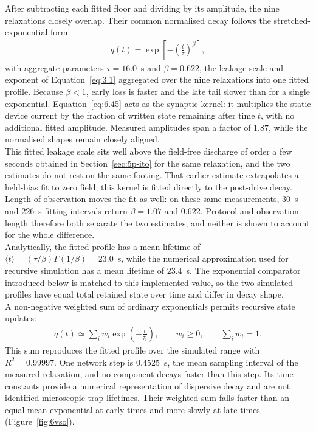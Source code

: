 \noindent After subtracting each fitted floor and dividing by its amplitude, the nine relaxations closely overlap.
Their common normalised decay follows the stretched-exponential form
\begin{align}
    q(t) = \exp\!\left[ -\left( \frac{t}{\tau} \right)^{\!\beta} \right], \label{eq:6.45}
\end{align}
\noindent with aggregate parameters $\tau=16.0$~s and $\beta=0.622$, the leakage scale and exponent of
Equation~\ref{eq:3.1} aggregated over the nine relaxations into one fitted profile. Because $\beta<1$, early loss is
faster and the late tail slower than for a single exponential. Equation~\ref{eq:6.45} acts as the synaptic kernel:
it multiplies the static device current by the fraction of written state remaining after time $t$, with no
additional fitted amplitude. Measured amplitudes span a factor of $1.87$, while the normalised shapes remain
closely aligned.\\

\noindent This fitted leakage scale sits well above the field-free discharge of order a few seconds obtained in
Section~\ref{sec:5p-ito} for the same relaxation, and the two estimates do not rest on the same footing.
That earlier estimate extrapolates a held-bias fit to zero field; this kernel is fitted directly to the post-drive
decay. Length of observation moves the fit as well: on these same measurements, $30$~s and $226$~s fitting intervals
return $\beta=1.07$ and $0.622$. Protocol and observation length therefore both separate the two estimates, and
neither is shown to account for the whole difference.\\

\noindent Analytically, the fitted profile has a mean lifetime of
$\langle t\rangle=(\tau/\beta)\Gamma(1/\beta)=23.0$~s, while the numerical approximation used for recursive
simulation has a mean lifetime of $23.4$~s. The exponential comparator introduced below is matched to this
implemented value, so the two simulated profiles have equal total retained state over time and differ in decay
shape.\\

\noindent A non-negative weighted sum of ordinary exponentials permits recursive state updates:
\begin{align}
        q(t) \simeq \sum_{i} w_i \exp\!\left( -\frac{t}{\tau_i} \right), \qquad w_i \geq 0, \qquad \sum_i w_i = 1.
    \label{eq:6.47}
\end{align}
\noindent This sum reproduces the fitted profile over the simulated range with $R^2=0.99997$. One network step is
$0.4525$~s, the mean sampling interval of the measured relaxation, and no component decays faster than this step.
Its time constants provide a numerical representation of dispersive decay and are not identified microscopic trap
lifetimes. Their weighted sum falls faster than an equal-mean exponential at early times and more slowly at late
times (Figure~\ref{fig:6vso}).\\

